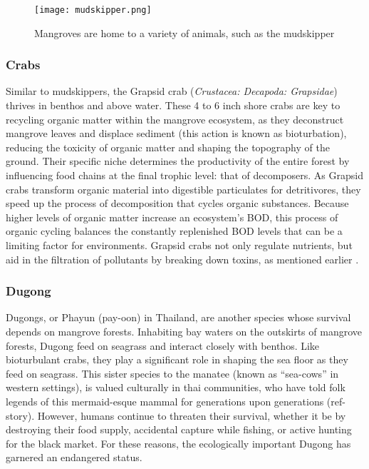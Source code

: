   
  \begin{figure}[!h]
    \centering
    \texttt{[image: mudskipper.png]}
    \caption {Mangroves are home to a variety of animals, such as the mudskipper}
    \label{fig:mudskipper}
\end{figure}


\subsubsection{Crabs}
  Similar to mudskippers, the Grapsid crab (\textit{Crustacea: Decapoda: Grapsidae}) thrives in benthos and above water. These 4 to 6 inch shore crabs are key to recycling organic matter within the mangrove ecosystem, as they deconstruct mangrove leaves and displace sediment (this action is known as bioturbation), reducing the toxicity of organic matter and shaping the topography of the ground. Their specific niche determines the productivity of  the entire forest by influencing food chains at the final trophic level: that of decomposers. As Grapsid crabs transform organic material into digestible particulates for detritivores, they speed up the process of decomposition that cycles organic substances. Because higher levels of organic matter increase an ecosystem's BOD, this process of organic cycling balances the constantly replenished BOD levels that can be a limiting factor for environments. Grapsid crabs not only regulate nutrients, but aid in the filtration of pollutants by breaking down toxins, as mentioned earlier \citep{lee1998ecological}.



\subsubsection{Dugong}	

Dugongs, or Phayun (pay-oon) in Thailand, are another species whose survival depends on mangrove forests. Inhabiting bay waters on the outskirts of mangrove forests, Dugong feed on seagrass and interact closely with benthos. Like bioturbulant crabs, they play a significant role in shaping the sea floor as they feed on seagrass. This sister species to the manatee (known as ``sea-cows'' in western settings), is valued culturally in thai communities, who have told folk legends of this mermaid-esque mammal for generations upon generations (ref- story). However, humans continue to threaten their survival, whether it be by destroying their food supply, accidental capture while fishing, or active hunting for the black market. For these reasons, the ecologically important Dugong has garnered an endangered status. 


